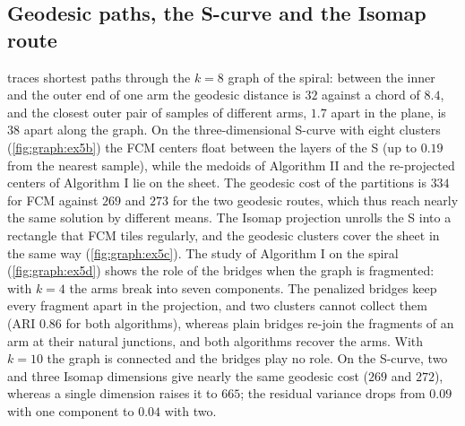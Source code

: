 
\subsection{Geodesic paths, the S-curve and the Isomap route}

 traces shortest paths through the $k=8$ graph of the spiral: between the inner and the outer end of one arm the geodesic distance is $32$ against a chord of $8.4$, and the closest outer pair of samples of different arms, $1.7$ apart in the plane, is $38$ apart along the graph. On the three-dimensional S-curve with eight clusters (\cref{fig:graph:ex5b}) the FCM centers float between the layers of the S (up to $0.19$ from the nearest sample), while the medoids of Algorithm II and the re-projected centers of Algorithm I lie on the sheet. The geodesic cost of the partitions is $334$ for FCM against $269$ and $273$ for the two geodesic routes, which thus reach nearly the same solution by different means. The Isomap projection unrolls the S into a rectangle that FCM tiles regularly, and the geodesic clusters cover the sheet in the same way (\cref{fig:graph:ex5c}). The study of Algorithm I on the spiral (\cref{fig:graph:ex5d}) shows the role of the bridges when the graph is fragmented: with $k=4$ the arms break into seven components. The penalized bridges keep every fragment apart in the projection, and two clusters cannot collect them (ARI $0.86$ for both algorithms), whereas plain bridges re-join the fragments of an arm at their natural junctions, and both algorithms recover the arms. With $k=10$ the graph is connected and the bridges play no role. On the S-curve, two and three Isomap dimensions give nearly the same geodesic cost ($269$ and $272$), whereas a single dimension raises it to $665$; the residual variance drops from $0.09$ with one component to $0.04$ with two.

